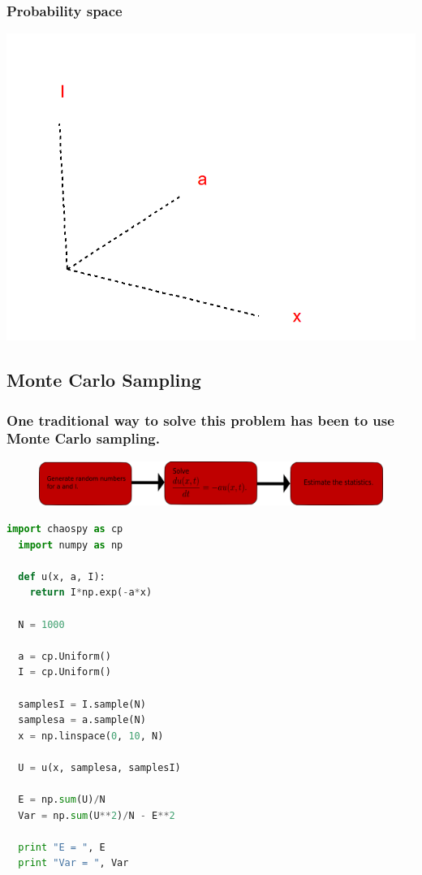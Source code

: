 \documentclass[handout]{beamer}
\begin{document}
\begin{frame}
  \frametitle{Probability space}
  \includegraphics[width=\textwidth]{probspace.png}
\end{frame}







\subsection{Monte Carlo Sampling}

\begin{frame}[fragile]
  \frametitle{One traditional way to solve this problem has been to use Monte Carlo sampling.}
    \begin{figure}
    \includegraphics[width=\textwidth]{MC.png}
  \end{figure}
\begin{lstlisting}[language=python]
  import chaospy as cp
  import numpy as np

  def u(x, a, I):
    return I*np.exp(-a*x)
    
  N = 1000

  a = cp.Uniform()
  I = cp.Uniform()

  samplesI = I.sample(N)
  samplesa = a.sample(N)
  x = np.linspace(0, 10, N)

  U = u(x, samplesa, samplesI)

  E = np.sum(U)/N
  Var = np.sum(U**2)/N - E**2

  print "E = ", E
  print "Var = ", Var
\end{lstlisting}

    
\end{frame}
\end{document}
